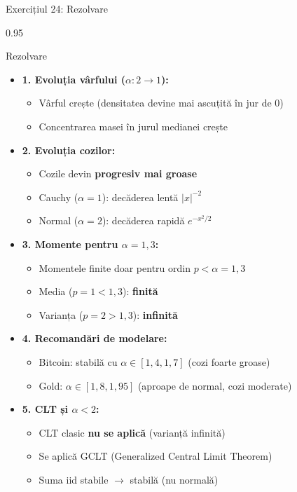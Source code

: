 \documentclass[9pt, aspectratio=169, t]{beamer}
\begin{document}
\begin{frame}[shrink=25]{Exercițiul 24: Rezolvare}
\begin{cminipage}{0.95\textwidth}
\begin{exampleblock}{Rezolvare}
\begin{itemize}\setlength{\itemsep}{0pt}
    \item \textbf{1. Evoluția vârfului ($\alpha: 2 \to 1$):}
    \begin{itemize}\setlength{\itemsep}{0pt}
        \item Vârful crește (densitatea devine mai ascuțită în jur de $0$)
        \item Concentrarea masei în jurul medianei crește
    \end{itemize}
    \item \textbf{2. Evoluția cozilor:}
    \begin{itemize}\setlength{\itemsep}{0pt}
        \item Cozile devin \textbf{progresiv mai groase}
        \item Cauchy ($\alpha=1$): decăderea lentă $|x|^{-2}$
        \item Normal ($\alpha=2$): decăderea rapidă $e^{-x^2/2}$
    \end{itemize}
    \item \textbf{3. Momente pentru $\alpha = 1{,}3$:}
    \begin{itemize}\setlength{\itemsep}{0pt}
        \item Momentele finite doar pentru ordin $p < \alpha = 1{,}3$
        \item Media ($p = 1 < 1{,}3$): \textbf{finită}
        \item Varianța ($p = 2 > 1{,}3$): \textbf{infinită}
    \end{itemize}
    \item \textbf{4. Recomandări de modelare:}
    \begin{itemize}\setlength{\itemsep}{0pt}
        \item Bitcoin: stabilă cu $\alpha \in [1{,}4, 1{,}7]$ (cozi foarte groase)
        \item Gold: $\alpha \in [1{,}8, 1{,}95]$ (aproape de normal, cozi moderate)
    \end{itemize}
    \item \textbf{5. CLT și $\alpha < 2$:}
    \begin{itemize}\setlength{\itemsep}{0pt}
        \item CLT clasic \textbf{nu se aplică} (varianță infinită)
        \item Se aplică GCLT (Generalized Central Limit Theorem)
        \item Suma iid stabile $\to$ stabilă (nu normală)
    \end{itemize}
\end{itemize}
\end{exampleblock}
\end{cminipage}
\end{frame}
\end{document}
